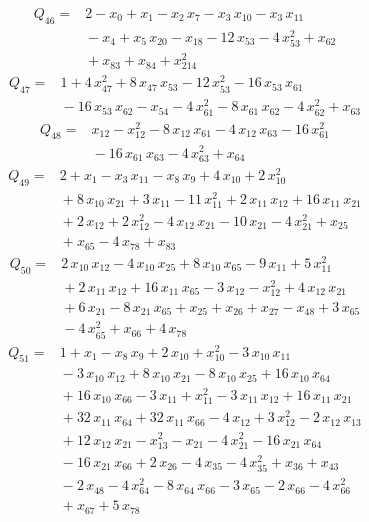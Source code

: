 \documentclass[11pt]{article}
\theoremstyle{definition}\newtheorem{definition}[theorem]{Definition}
\begin{document}
\begin{align*}
Q_{46}={}&2-x_{0}+x_{1}-x_{2}\,x_{7}-x_{3}\,x_{10}-x_{3}\,x_{11}
\\ &{}-x_{4}+x_{5}\,x_{20}-x_{18}-12\,x_{53}-4\,x_{53}^{2}+x_{62}
\\ &{}+x_{83}+x_{84}+x_{214}^{2}
\end{align*}
\begin{align*}
Q_{47}={}&1+4\,x_{47}^{2}+8\,x_{47}\,x_{53}-12\,x_{53}^{2}-16\,x_{53}\,x_{61}
\\ &{}-16\,x_{53}\,x_{62}-x_{54}-4\,x_{61}^{2}-8\,x_{61}\,x_{62}-4\,x_{62}^{2}+x_{63}
\end{align*}
\begin{align*}
Q_{48}={}&x_{12}-x_{12}^{2}-8\,x_{12}\,x_{61}-4\,x_{12}\,x_{63}-16\,x_{61}^{2}
\\ &{}-16\,x_{61}\,x_{63}-4\,x_{63}^{2}+x_{64}
\end{align*}
\begin{align*}
Q_{49}={}&2+x_{1}-x_{3}\,x_{11}-x_{8}\,x_{9}+4\,x_{10}+2\,x_{10}^{2}
\\ &{}+8\,x_{10}\,x_{21}+3\,x_{11}-11\,x_{11}^{2}+2\,x_{11}\,x_{12}+16\,x_{11}\,x_{21}
\\ &{}+2\,x_{12}+2\,x_{12}^{2}-4\,x_{12}\,x_{21}-10\,x_{21}-4\,x_{21}^{2}+x_{25}
\\ &{}+x_{65}-4\,x_{78}+x_{83}
\end{align*}
\begin{align*}
Q_{50}={}&2\,x_{10}\,x_{12}-4\,x_{10}\,x_{25}+8\,x_{10}\,x_{65}-9\,x_{11}+5\,x_{11}^{2}
\\ &{}+2\,x_{11}\,x_{12}+16\,x_{11}\,x_{65}-3\,x_{12}-x_{12}^{2}+4\,x_{12}\,x_{21}
\\ &{}+6\,x_{21}-8\,x_{21}\,x_{65}+x_{25}+x_{26}+x_{27}-x_{48}+3\,x_{65}
\\ &{}-4\,x_{65}^{2}+x_{66}+4\,x_{78}
\end{align*}
\begin{align*}
Q_{51}={}&1+x_{1}-x_{8}\,x_{9}+2\,x_{10}+x_{10}^{2}-3\,x_{10}\,x_{11}
\\ &{}-3\,x_{10}\,x_{12}+8\,x_{10}\,x_{21}-8\,x_{10}\,x_{25}+16\,x_{10}\,x_{64}
\\ &{}+16\,x_{10}\,x_{66}-3\,x_{11}+x_{11}^{2}-3\,x_{11}\,x_{12}+16\,x_{11}\,x_{21}
\\ &{}+32\,x_{11}\,x_{64}+32\,x_{11}\,x_{66}-4\,x_{12}+3\,x_{12}^{2}-2\,x_{12}\,x_{13}
\\ &{}+12\,x_{12}\,x_{21}-x_{13}^{2}-x_{21}-4\,x_{21}^{2}-16\,x_{21}\,x_{64}
\\ &{}-16\,x_{21}\,x_{66}+2\,x_{26}-4\,x_{35}-4\,x_{35}^{2}+x_{36}+x_{43}
\\ &{}-2\,x_{48}-4\,x_{64}^{2}-8\,x_{64}\,x_{66}-3\,x_{65}-2\,x_{66}-4\,x_{66}^{2}
\\ &{}+x_{67}+5\,x_{78}
\end{align*}
\end{document}
